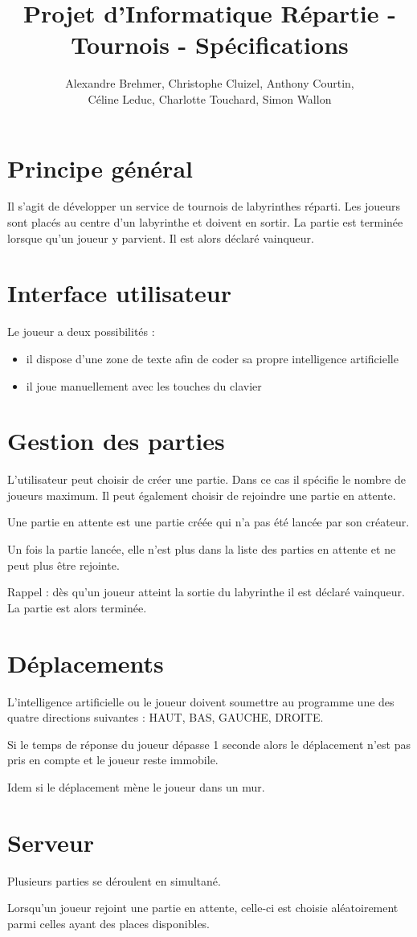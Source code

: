 \documentclass[a4paper,12pt]{article}
\title{Projet d'Informatique Répartie - Tournois - Spécifications}
\author{Alexandre Brehmer, Christophe Cluizel, Anthony Courtin,\\Céline Leduc, Charlotte Touchard, Simon Wallon}
\begin{document}
\maketitle

\section{Principe général}
Il s'agit de développer un service de tournois de labyrinthes réparti. Les joueurs sont placés au centre d'un labyrinthe et doivent en sortir. La partie est terminée lorsque qu'un joueur y parvient. Il est alors déclaré vainqueur.

\section{Interface utilisateur}
Le joueur a deux possibilités :
\begin{itemize}
	\item il dispose d'une zone de texte afin de coder sa propre intelligence artificielle
	\item il joue manuellement avec les touches du clavier
\end{itemize}

\section{Gestion des parties}
L'utilisateur peut choisir de créer une partie. Dans ce cas il spécifie le nombre de joueurs maximum. Il peut également choisir de rejoindre une partie en attente.

Une partie en attente est une partie créée qui n'a pas été lancée par son créateur.

Un fois la partie lancée, elle n'est plus dans la liste des parties en attente et ne peut plus être rejointe.

Rappel : dès qu'un joueur atteint la sortie du labyrinthe il est déclaré vainqueur. La partie est alors terminée.

\section{Déplacements}
L'intelligence artificielle ou le joueur doivent soumettre au programme une des quatre directions suivantes : HAUT, BAS, GAUCHE, DROITE.

Si le temps de réponse du joueur dépasse 1 seconde alors le déplacement n'est pas pris en compte et le joueur reste immobile.

Idem si le déplacement mène le joueur dans un mur.

\section{Serveur}
Plusieurs parties se déroulent en simultané.

Lorsqu'un joueur rejoint une partie en attente, celle-ci est choisie aléatoirement parmi celles ayant des places disponibles.
\end{document}
